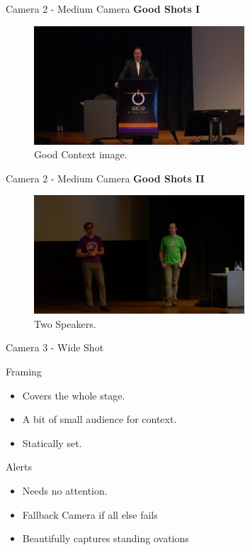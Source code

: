\documentclass[aspectratio=169]{beamer}
\begin{document}
\begin{frame}{Camera 2 - Medium Camera}
	\textbf{Good Shots I}
	\begin{figure} 
		\centering
		\includegraphics[width=0.7\textwidth]{images/medium1.png}
		\caption{Good Context image.}
	\end{figure}
\end{frame}

\begin{frame}{Camera 2 - Medium Camera}
	\textbf{Good Shots II}
	\begin{figure} 
		\centering
		\includegraphics[width=0.7\textwidth]{images/medium2.png}
		\caption{Two Speakers.}
	\end{figure}
\end{frame}

\begin{frame}{Camera 3 - Wide Shot}
		\begin{block}{Framing}
			\begin{itemize}
				\item Covers the whole stage.
				\item A bit of small audience for context.
				\item Statically set.
			\end{itemize}
		\end{block}

		\begin{alertblock}{Alerts}
			\begin{itemize}
				\item Needs no attention. 
				\item Fallback Camera if all else fails 
				\item Beautifully captures standing ovations
			\end{itemize}
		\end{alertblock}
\end{frame}
\end{document}
